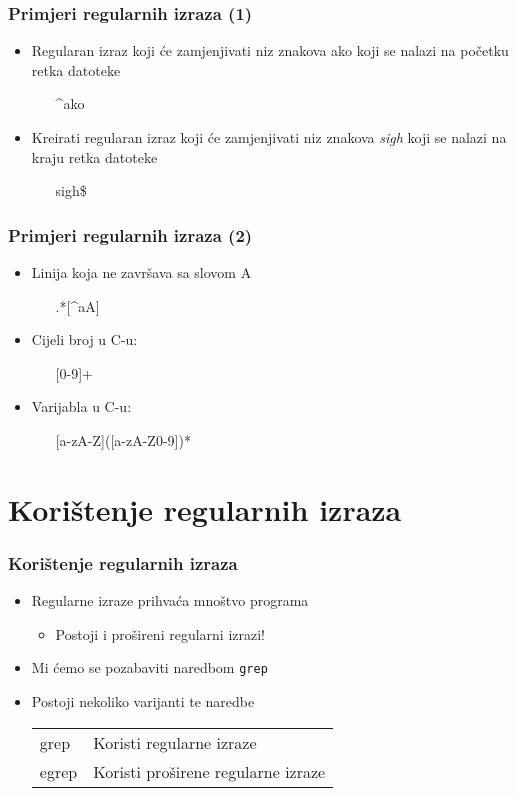 \documentclass[table,usenames,dvipsnames]{beamer}
\newcommand{\shell}[1]{\texttt{#1}}
\begin{document}
\begin{frame}[t]
\frametitle{Primjeri regularnih izraza (1)}
\begin{itemize}
  \item Regularan izraz koji će zamjenjivati niz znakova ako koji se nalazi na
        početku retka datoteke
  \begin{itemize}
    \item[] \textasciicircum{}ako
  \end{itemize}
  \item Kreirati regularan izraz koji će zamjenjivati niz znakova \emph{sigh}
        koji se nalazi na kraju retka datoteke
  \begin{itemize}
    \item[] sigh\$
  \end{itemize}
\end{itemize}
\end{frame}

\begin{frame}[t]
\frametitle{Primjeri regularnih izraza (2)}
\begin{itemize}
  \item Linija koja ne završava sa slovom A 
  \begin{itemize}
    \item[] .*[\textasciicircum{}aA]
  \end{itemize}
  \item Cijeli broj u C-u:
  \begin{itemize}
    \item[] [0-9]+
  \end{itemize}
  \item Varijabla u C-u:
  \begin{itemize}
    \item[] [a-zA-Z]([a-zA-Z0-9])*
  \end{itemize} 
\end{itemize}
\end{frame}

\section{Korištenje regularnih izraza}
\begin{frame}[t]
\frametitle{Korištenje regularnih izraza}
\begin{itemize}
  \item Regularne izraze prihvaća mnoštvo programa
  \begin{itemize}
    \item Postoji i prošireni regularni izrazi!
  \end{itemize}
  \item Mi ćemo se pozabaviti naredbom \shell{grep}
  \item Postoji nekoliko varijanti te naredbe
  \begin{tabular}{l l}
    grep  &  Koristi regularne izraze \\
    egrep &  Koristi proširene regularne izraze
  \end{tabular}
\end{itemize}
\end{frame}
  
\end{document}
